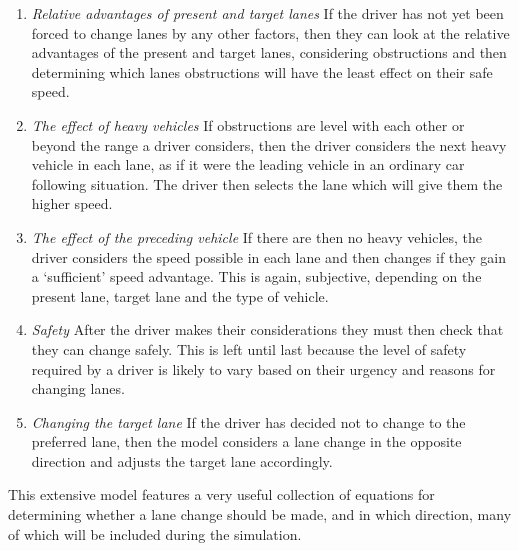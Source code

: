 \begin{enumerate}

\item \textit{Relative advantages of present and target lanes}
If the driver has not yet been forced to change lanes by any other factors, then they can look at the relative advantages of the present and target lanes, considering obstructions and then determining which lanes obstructions will have the least effect on their safe speed.
\item \textit{The effect of heavy vehicles} 
If obstructions are level with each other or beyond the range a driver considers, then the driver considers the next heavy vehicle in each lane, as if it were the leading vehicle in an ordinary car following situation. The driver then selects the lane which will give them the higher speed.
\item \textit{The effect of the preceding vehicle}
If there are then no heavy vehicles, the driver considers the speed possible in each lane and then changes if they gain a `sufficient' speed advantage. This is again, subjective, depending on the present lane, target lane and the type of vehicle.


\item \textit{Safety}
After the driver makes their considerations they must then check that they can change safely. This is left until last because the level of safety required by a driver is likely to vary based on their urgency and reasons for changing lanes.
\item \textit{Changing the target lane}
If the driver has decided not to change to the preferred lane, then the model considers a lane change in the opposite direction and adjusts the target lane accordingly.

\end{enumerate}

This extensive model features a very useful collection of equations for determining whether a lane change should be made, and in which direction, many of which will be included during the simulation. 


